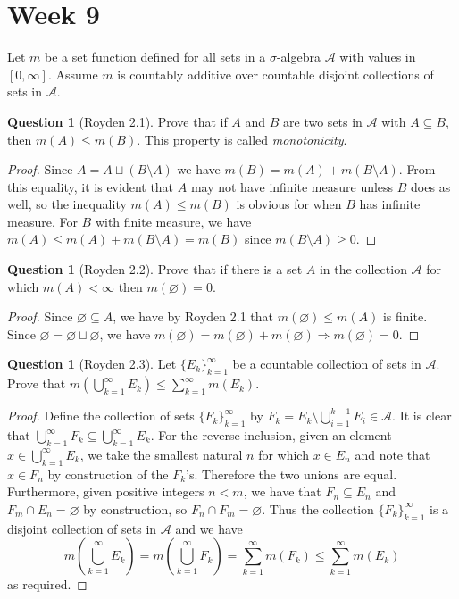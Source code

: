 \documentclass{article}
\renewcommand{\implies}{\Rightarrow}
\theoremstyle{definition} %
\numberwithin{thm}{section} %
\theoremstyle{definition} %
\newtheorem{question}[thm]{Question}
\begin{document}
\section{Week 9}

Let $m$ be a set function defined for all sets in a $\sigma$-algebra $\mathcal{A}$ with values in $[0, \infty]$. Assume $m$ is countably additive over countable disjoint collections of sets in $\mathcal{A}$.

\begin{question}[Royden 2.1]
Prove that if $A$ and $B$ are two sets in $\mathcal{A}$ with $A \subseteq B$, then $m(A) \leq m(B)$. This property is called \textit{monotonicity}.
\end{question}
\begin{proof}
Since $A = A \sqcup (B \setminus A)$ we have $m(B) = m(A) + m(B \setminus A)$. From this equality, it is evident that $A$ may not have infinite measure unless $B$ does as well, so the inequality $m(A) \leq m(B)$ is obvious for when $B$ has infinite measure. For $B$ with finite measure, we have $m(A) \leq m(A) + m(B \setminus A) = m(B)$ since $m(B \setminus A) \geq 0$.
\end{proof}

\begin{question}[Royden 2.2]
Prove that if there is a set $A$ in the collection $\mathcal{A}$ for which $m(A) < \infty$ then $m(\varnothing) = 0$.
\end{question}
\begin{proof}
Since $\varnothing \subseteq A$, we have by Royden 2.1 that $m(\varnothing) \leq m(A)$ is finite. Since $\varnothing = \varnothing \sqcup \varnothing$, we have $m(\varnothing) = m(\varnothing) + m(\varnothing) \implies m(\varnothing) = 0$.
\end{proof}

\begin{question}[Royden 2.3]
Let ${\{E_k\}}_{k = 1}^\infty$ be a countable collection of sets in $\mathcal{A}$. Prove that $m(\bigcup_{k = 1}^\infty E_k) \leq \sum_{k = 1}^\infty m(E_k)$.
\end{question}
\begin{proof}
Define the collection of sets ${\{F_k\}}_{k = 1}^\infty$ by $F_k = E_k \setminus \bigcup_{i = 1}^{k - 1} E_i \in \mathcal{A}$. It is clear that $\bigcup_{k = 1}^\infty F_k \subseteq \bigcup_{k = 1}^\infty E_k$. For the reverse inclusion, given an element $x \in \bigcup_{k = 1}^\infty E_k$, we take the smallest natural $n$ for which $x \in E_n$ and note that $x \in F_n$ by construction of the $F_k$'s. Therefore the two unions are equal. Furthermore, given positive integers $n < m$, we have that $F_n \subseteq E_n$ and $F_m \cap E_n = \varnothing$ by construction, so $F_n \cap F_m = \varnothing$. Thus the collection ${\{F_k\}}_{k = 1}^\infty$ is a disjoint collection of sets in $\mathcal{A}$ and we have
\[ m\left(\bigcup_{k = 1}^\infty E_k\right) = m\left(\bigcup_{k = 1}^\infty F_k\right) = \sum_{k = 1}^\infty m(F_k) \leq \sum_{k = 1}^\infty m(E_k) \]
as required.
\end{proof}
\end{document}
